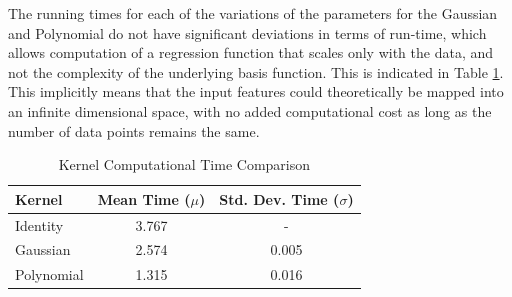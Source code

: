 \documentclass[parskip=full]{scrartcl}
\begin{document}
            The running times for each of the variations of the parameters for the Gaussian and Polynomial do not have significant deviations in terms of run-time, which allows computation of a regression function that scales only with the data, and not the complexity of the underlying basis function. This is indicated in Table \ref{tab:kernel_computational_time_comparison}. This implicitly means that the input features could theoretically be mapped into an infinite dimensional space, with no added computational cost as long as the number of data points remains the same.
            \begin{table}[ht]
                \centering
                \begin{tabular}{| l | c | c |}
                \hline
                \textbf{Kernel} & \textbf{Mean Time ($\mu$)} & \textbf{Std. Dev. Time ($\sigma$)} \\
                \hline
                \hline
                    Identity & 3.767 & - \\
                \hline
                    Gaussian & 2.574 & 0.005 \\
                \hline
                    Polynomial & 1.315 & 0.016 \\
                \hline
                \end{tabular}
                \caption{Kernel Computational Time Comparison}
                \label{tab:kernel_computational_time_comparison}
            \end{table}

        

    

\end{document}
